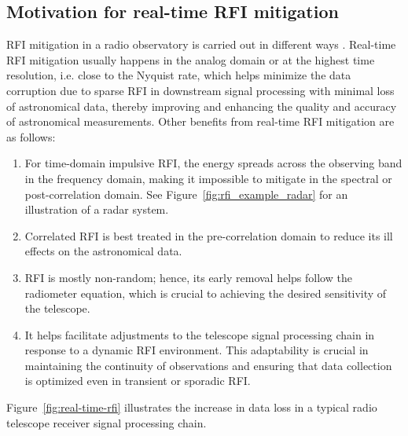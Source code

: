 \subsection{Motivation for real-time RFI mitigation}
\label{subsection:hardware:introduction: motivations}

RFI mitigation in a radio observatory is carried out in different ways \citep{ford2014rfi}. Real-time RFI mitigation usually happens in the analog domain or at the highest time resolution, i.e. close to the Nyquist rate, which helps minimize the data corruption due to sparse RFI in downstream signal processing with minimal loss of astronomical data, thereby improving and enhancing the quality and accuracy of astronomical measurements. Other benefits from real-time RFI mitigation are as follows:

\begin{enumerate}
\item For time-domain impulsive RFI, the energy spreads across the observing band in the frequency domain, making it impossible to mitigate in the spectral or post-correlation domain.  See Figure~\ref{fig:rfi_example_radar} for an illustration of a radar system.

\item Correlated RFI is best treated in the pre-correlation domain to reduce its ill effects on the astronomical data.

\item RFI is mostly non-random; hence, its early removal helps follow the radiometer equation, which is crucial to achieving the desired sensitivity of the telescope.

\item It helps facilitate adjustments to the telescope signal processing chain in response to a dynamic RFI environment. This adaptability is crucial in maintaining the continuity of observations and ensuring that data collection is optimized even in transient or sporadic RFI.
\end{enumerate}

Figure~\ref{fig:real-time-rfi} illustrates the increase in data loss in a typical radio telescope receiver signal processing chain.


